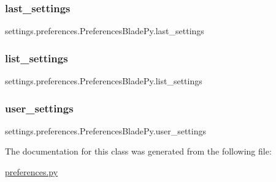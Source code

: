 \subsubsection{\texorpdfstring{last\+\_\+settings}{last\_settings}}
{\footnotesize\ttfamily settings.\+preferences.\+Preferences\+Blade\+Py.\+last\+\_\+settings}

\hypertarget{classsettings_1_1preferences_1_1_preferences_blade_py_aec84d483efd9155fc73699fe365ac9c2}{}\label{classsettings_1_1preferences_1_1_preferences_blade_py_aec84d483efd9155fc73699fe365ac9c2} 
\subsubsection{\texorpdfstring{list\+\_\+settings}{list\_settings}}
{\footnotesize\ttfamily settings.\+preferences.\+Preferences\+Blade\+Py.\+list\+\_\+settings}

\hypertarget{classsettings_1_1preferences_1_1_preferences_blade_py_a0a02958126e9787f79af1a0f45fab30c}{}\label{classsettings_1_1preferences_1_1_preferences_blade_py_a0a02958126e9787f79af1a0f45fab30c} 
\subsubsection{\texorpdfstring{user\+\_\+settings}{user\_settings}}
{\footnotesize\ttfamily settings.\+preferences.\+Preferences\+Blade\+Py.\+user\+\_\+settings}



The documentation for this class was generated from the following file\+:\begin{DoxyCompactItemize}
\item 
\hyperlink{preferences_8py}{preferences.\+py}\end{DoxyCompactItemize}
